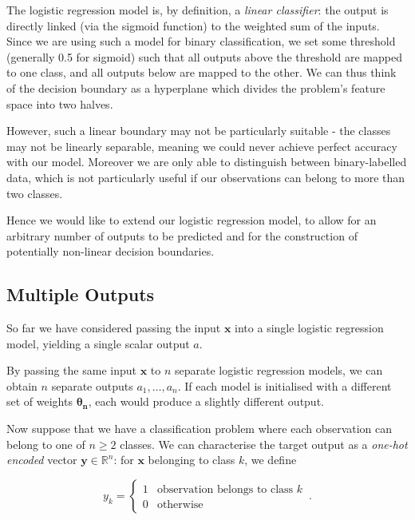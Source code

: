 \documentclass{article}[11pt]
\begin{document}
    The logistic regression model is, by definition, a \textit{linear classifier}: the output is directly linked (via the sigmoid function) to the weighted sum of the inputs. Since we are using such a model for binary classification, we set some threshold (generally 0.5 for sigmoid) such that all outputs above the threshold are mapped to one class, and all outputs below are mapped to the other. We can thus think of the decision boundary as a hyperplane which divides the problem's feature space into two halves.
    
    However, such a linear boundary may not be particularly suitable - the classes may not be linearly separable, meaning we could never achieve perfect accuracy with our model. Moreover we are only able to distinguish between binary-labelled data, which is not particularly useful if our observations can belong to more than two classes.
    
    Hence we would like to extend our logistic regression model, to allow for an arbitrary number of outputs to be predicted and for the construction of potentially non-linear decision boundaries.
    
    

    \subsection{Multiple Outputs} \label{sec:multi_out}
    
        So far we have considered passing the input $\mathbf{x}$ into a single logistic regression model, yielding a single scalar output $a$.
    
        By passing the same input $\mathbf{x}$ to $n$ separate logistic regression models, we can obtain $n$ separate outputs $a_1, \ldots, a_n$. If each model is initialised with a different set of weights $\boldsymbol{\theta_n}$, each would produce a slightly different output.
        
        Now suppose that we have a classification problem where each observation can belong to one of $n \geq 2$ classes. We can characterise the target output as a \textit{one-hot encoded} vector $\mathbf{y} \in \mathbb{R}^n$: for $\mathbf{x}$ belonging to class $k$, we define
        
        $$
        y_k = \begin{cases}
            1 & \text{observation belongs to class } k \\
            0 & \text{otherwise}
        \end{cases} \,.
        $$
        
\end{document}
